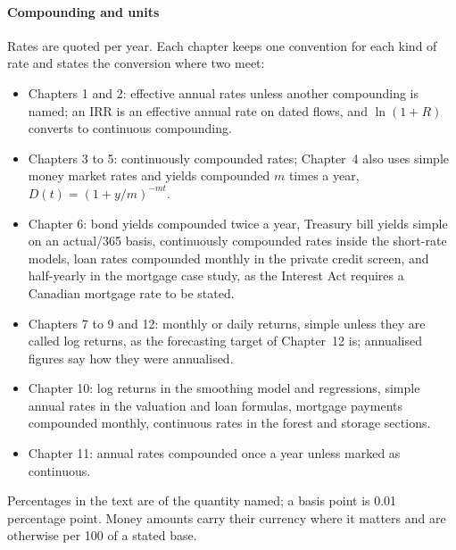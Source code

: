 \endgroup

\paragraph{Compounding and units}
Rates are quoted per year. Each chapter keeps one convention for each kind of rate and states the
conversion where two meet:
\begin{itemize}[nosep]
  \item Chapters 1 and 2: effective annual rates unless another compounding is named; an IRR is an
        effective annual rate on dated flows, and $\ln(1+R)$ converts to continuous compounding.
  \item Chapters 3 to 5: continuously compounded rates; Chapter~4 also uses simple money market rates
        and yields compounded $m$ times a year, $D(t)=(1+y/m)^{-mt}$.
  \item Chapter 6: bond yields compounded twice a year, Treasury bill yields simple on an actual/365
        basis, continuously compounded rates inside the short-rate models, loan rates compounded
        monthly in the private credit screen, and half-yearly in the mortgage case study, as the
        Interest Act requires a Canadian mortgage rate to be stated.
  \item Chapters 7 to 9 and 12: monthly or daily returns, simple unless they are called log returns,
        as the forecasting target of Chapter~12 is; annualised figures say how they were annualised.
  \item Chapter 10: log returns in the smoothing model and regressions, simple annual rates in the
        valuation and loan formulas, mortgage payments compounded monthly, continuous rates in the
        forest and storage sections.
  \item Chapter 11: annual rates compounded once a year unless marked as continuous.
\end{itemize}
Percentages in the text are of the quantity named; a basis point is 0.01 percentage point. Money
amounts carry their currency where it matters and are otherwise per 100 of a stated base.
